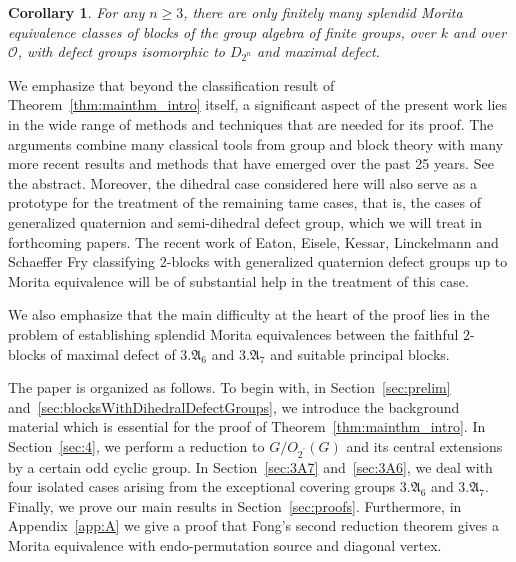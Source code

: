 \documentclass[11pt,a4paper,twoside]{amsart}
\newcommand{\fA}{{\mathfrak{A}}}
\newcommand{\cO}{{\mathcal{O}}}
\newtheorem{cor}[thm]{Corollary}
\theoremstyle{defnew}
\theoremstyle{remark}
\theoremstyle{plain}
\begin{document}
\begin{cor}\label{cor:intro_PuigsConj}%
    For any $n\geq 3$, there are only finitely many splendid Morita equivalence classes of blocks of the group algebra of finite groups, over $k$ and over $\cO$, with defect groups isomorphic to $D_{2^n}$ and maximal defect. 
\end{cor}

We emphasize that beyond the classification result of Theorem~\ref{thm:mainthm_intro} itself, a significant aspect of the present work lies in the wide range of methods and techniques that are needed for its proof. The arguments combine many classical tools from group and block theory with many more recent results and methods that have emerged over the past 25 years. See the abstract.
Moreover, the dihedral case considered here will also serve as a prototype for the treatment of the remaining tame cases, that is, the cases of generalized quaternion and semi-dihedral defect group, which we will treat in forthcoming papers. The recent work of Eaton, Eisele, Kessar, Linckelmann and Schaeffer Fry \cite{EEKLSF26} classifying $2$-blocks with generalized quaternion defect groups up to Morita equivalence will be of substantial help in the treatment of this case.

We also emphasize that the main difficulty at the heart of the proof lies in the problem of establishing splendid Morita equivalences between the faithful \(2\)-blocks of maximal defect of \(3.\fA_6\) and \(3.\fA_7\) and suitable principal blocks.


The paper is organized as follows. To begin with, in Section~\ref{sec:prelim} and~\ref{sec:blocksWithDihedralDefectGroups},  we introduce the background material which is essential for the proof of Theorem~\ref{thm:mainthm_intro}. In Section~\ref{sec:4}, we perform a reduction to $G/O_{2^\prime}(G)$ and its central extensions by a certain odd cyclic group. In Section~\ref{sec:3A7} and~\ref{sec:3A6}, we deal with four isolated cases arising from the exceptional covering groups $3.\fA_6$ and $3.\fA_7$.
Finally, we prove our main results in Section~\ref{sec:proofs}. 
Furthermore, in  Appendix~\ref{app:A} we give a proof that Fong's second reduction theorem gives a Morita equivalence with endo-permutation source and diagonal vertex.








\end{document}
